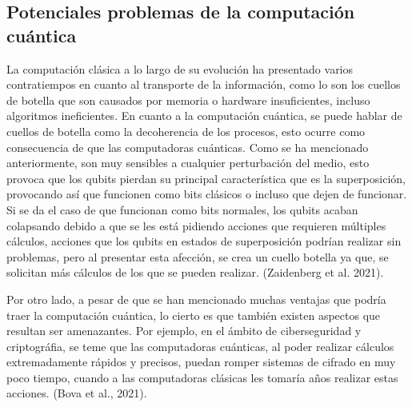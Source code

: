 \documentclass[twoside]{article}
\begin{document}
\subsection{Potenciales problemas de la computación cuántica}

La computación clásica a lo largo de su evolución ha presentado varios contratiempos en cuanto al transporte de la información, como lo son los cuellos de botella que son causados por memoria o hardware insuficientes, incluso algoritmos ineficientes. En cuanto a la computación cuántica, se puede hablar de cuellos de botella como la decoherencia de los procesos, esto ocurre como consecuencia de que las computadoras cuánticas. Como se ha mencionado anteriormente, son muy sensibles a cualquier perturbación del medio, esto provoca que los qubits pierdan su principal característica que es la superposición, provocando así que funcionen como bits clásicos o incluso que dejen de funcionar. Si se da el caso de que funcionan como bits normales, los qubits acaban colapsando debido a que se les está pidiendo acciones que requieren múltiples cálculos, acciones que los qubits en estados de superposición podrían realizar sin problemas, pero al presentar esta afección, se crea un cuello botella ya que, se solicitan más cálculos de los  que se pueden realizar. (Zaidenberg et al. 2021).

Por otro lado, a pesar de que se han mencionado muchas ventajas que podría traer la computación cuántica, lo cierto es que también existen aspectos que resultan ser amenazantes. Por ejemplo, en el ámbito de ciberseguridad y criptográfia, se teme que las computadoras cuánticas, al poder realizar cálculos extremadamente rápidos y precisos, puedan romper sistemas de cifrado en muy poco tiempo, cuando a las computadoras clásicas les tomaría años realizar estas acciones. (Bova et al., 2021). 

\newpage
\end{document}
